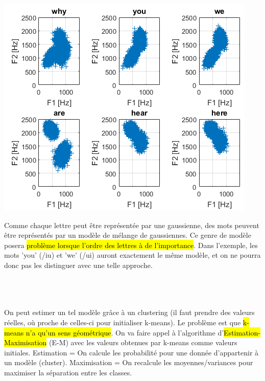\documentclass[letterpaper, 12pt]{article}
\newcommand{\alinea}{
\hspace*{0.5cm}}
\begin{document}
			\begin{minipage}{0.4\textwidth}
				\begin{center}
					\includegraphics[width=\textwidth]{Images/dictation-gmm}
				\end{center}
			\end{minipage}\hfill
			\begin{minipage}{0.55\textwidth}
				\alinea Comme chaque lettre peut être représentée par une gaussienne, des mots peuvent être représentés par un modèle
					de mélange de gaussiennes. Ce genre de modèle posera \hl{problème lorsque l'ordre des lettres à de l'importance}. 
					Dans l'exemple, les mots 'you' (/iu) et 'we' (/ui) auront exactement le même modèle, et on ne pourra donc pas les
					distinguer avec une telle approche. 
			\end{minipage}~\\~\\~\\
			\alinea On peut estimer un tel modèle grâce à un clustering (il faut prendre des valeurs réelles, où proche de celles-ci
				pour initialiser k-means). Le problème est que \hl{k-means n'a qu'un sens géométrique}. On va faire appel à l'algorithme
				d'\hl{Estimation-Maximisation} (E-M) avec les valeurs obtenues par k-means comme valeurs initiales.
				Estimation = On calcule les probabilité pour une donnée d'appartenir à un modèle (cluster). Maximisation = On
				recalcule les moyennes/variances pour maximiser la séparation entre les classes.
\end{document}
